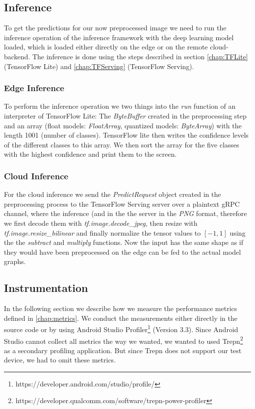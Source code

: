

\subsection{Inference}
To get the predictions for our now preprocessed image we need to run the inference operation of the inference framework with the deep learning model loaded, which is loaded either directly on the edge or on the remote cloud-backend. 
The inference is done using the steps described in section \ref{chap:TFLite} (TensorFlow Lite) and \ref{chap:TFServing} (TensorFlow Serving).
\subsubsection{Edge Inference}
To perform the inference operation we two things into the \emph{run} function of an interpreter of TensorFlow Lite: The \emph{ByteBuffer} created in the preprocessing step and an array (float models: \emph{FloatArray}, quantized models: \emph{ByteArray}) with the length 1001 (number of classes). TensorFlow lite then writes the confidence levels of the different classes to this array. We then sort the array for the five classes with the highest confidence and print them to the screen.

\subsubsection{Cloud Inference}
\label{chap:CloudInfImpl}

For the cloud inference we send the \emph{PredictRequest} object created in the preprocessing process to the TensorFlow Serving server over a plaintext gRPC channel, where the inference (and in the
the server in the \emph{PNG} format, therefore we first decode them with \emph{tf.image.decode\_jpeg}, then resize with \emph{tf.image.resize\_bilinear} and finally normalize the tensor values to $[-1,1]$ using the the \emph{subtract} and \emph{multiply} functions. Now the input has the same shape as if they would have been preprocessed on the edge can be fed to the actual model graphs.

\subsection{Instrumentation}
\label{chap:insta_measurements}
In the following section we describe how we measure the performance metrics defined in \ref{chap:metrics}.
We conduct the measurements either directly in the source code or by using Android Studio Profiler\footnote{https://developer.android.com/studio/profile/} (Version 3.3). Since Android Studio cannot collect all metrics the way we wanted, we wanted to used Trepn\footnote{https://developer.qualcomm.com/software/trepn-power-profiler} as a secondary profiling application. But since Trepn does not support our test device, we had to omit these metrics.


